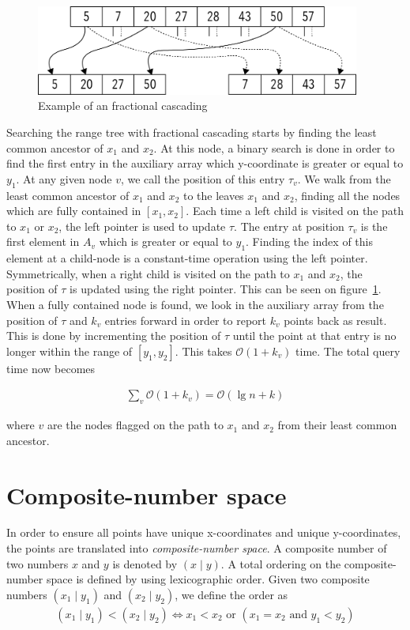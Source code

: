 \begin{figure}[h]
    \centering
    \includegraphics[width = 0.95\textwidth]{pictures/fractional_cascading.png}
    \caption{Example of an fractional cascading}\label{fig:fractional}
\end{figure}


Searching the range tree with fractional cascading starts by finding the least common ancestor of $x_1$ and $x_2$. At this node, a binary search is done in order to find the first entry in the auxiliary array which y-coordinate is greater or equal to $y_1$. At any given node $v$, we call the position of this entry $\tau_v$. We walk from the least common ancestor of $x_1$ and $x_2$ to the leaves $x_1$ and $x_2$, finding all the nodes which are fully contained in $[x_1, x_2]$. Each time a left child is visited on the path to $x_1$ or $x_2$, the left pointer is used to update $\tau$. The entry at position $\tau_v$ is the first element in $A_v$ which is greater or equal to $y_1$. Finding the index of this element at a child-node is a constant-time operation using the left pointer. Symmetrically, when a right child is visited on the path to $x_1$ and $x_2$, the position of $\tau$ is updated using the right pointer. This can be seen on figure~\ref{fig:fractional}. When a fully contained node is found, we look in the auxiliary array from the position of $\tau$ and $k_v$ entries forward in order to report $k_v$ points back as result. This is done by incrementing the position of $\tau$ until the point at that entry is no longer within the range of $[y_1, y_2]$. This takes $\mathcal{O}(1+k_v)$ time. The total query time now becomes

\begin{align*}
  \sum\limits_{v} \mathcal{O}(1 + k_v) = \mathcal{O}(\lg n + k)
\end{align*}

\noindent where $v$ are the nodes flagged on the path to $x_1$ and $x_2$ from their least common ancestor.

\section{Composite-number space} 
\label{sect:composite}
In order to ensure all points have unique x-coordinates and unique y-coordinates, the points are translated into \emph{composite-number space}\cite{compgeo}. A composite number of two numbers $x$ and $y$ is denoted by $(x \mid y)$. A total ordering on the composite-number space is defined by using lexicographic order. Given two composite numbers $(x_1 \mid y_1)$ and $(x_2 \mid y_2)$, we define the order as
\begin{align*}
  (x_1 \mid y_1) < (x_2 \mid y_2) \iff x_1 < x_2 \text{ or } (x_1 = x_2 \text{ and } y_1 < y_2)
\end{align*}

